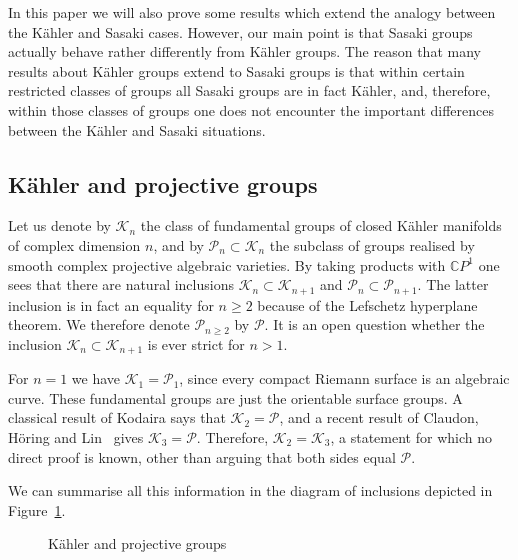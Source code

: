 \documentclass[12pt,leqno]{amsart}
\newcommand{\C}{\mathbb{C}}
\newcommand{\Pg}{\mathcal{P}}
\newcommand{\Kg}{\mathcal{K}}
\begin{document}
 In this paper we will also prove some results which extend the analogy between
 the K\"ahler and Sasaki cases. However, our main point is that Sasaki groups actually behave 
 rather differently from K\"ahler groups. The reason that many results about K\"ahler 
 groups extend to Sasaki groups is that within certain restricted classes of groups all
 Sasaki groups are in fact K\"ahler, and, therefore, within those classes of groups one does 
 not encounter the important differences between the K\"ahler and Sasaki situations.
 
 
 \subsection{K\"ahler and projective groups}
 
 Let us denote by $\Kg_n$ the class of fundamental groups of closed K\"ahler manifolds of complex 
 dimension $n$, and by $\Pg_n\subset\Kg_n$ the subclass of groups realised by smooth complex projective 
algebraic varieties. By taking products with $\C P^1$ one sees that there are 
natural inclusions $\Kg_n\subset\Kg_{n+1}$ and $\Pg_n\subset\Pg_{n+1}$. The latter inclusion is in 
fact an equality for $n\geq 2$ because of the Lefschetz hyperplane theorem. We therefore denote 
$\Pg_{n\geq 2}$ by $\Pg$. It is an open question whether the inclusion $\Kg_n\subset\Kg_{n+1}$
is ever strict for $n>1$.

For $n=1$ we have $\Kg_1=\Pg_1$, since every compact Riemann surface is an algebraic curve. These
fundamental groups are just the orientable surface groups.
A classical result of Kodaira says that $\Kg_2=\Pg$, and a recent result of Claudon, H\"oring and Lin~\cite{CHL}
gives $\Kg_3=\Pg$. Therefore, $\Kg_2=\Kg_3$, a statement for which no direct proof is known, other 
than arguing that both sides equal $\Pg$.

We can summarise all this information in the diagram of inclusions depicted in Figure~\ref{Kaehler}.

\begin{figure} 
\caption{K\"ahler and projective groups}\label{Kaehler}
\end{figure}
\end{document}

